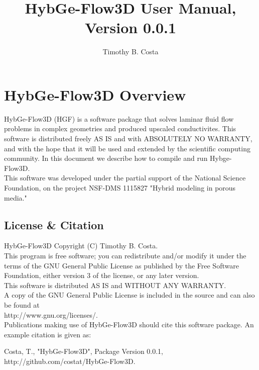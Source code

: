 \documentclass{report}
\title{HybGe-Flow3D User Manual, Version 0.0.1}
\author{Timothy B. Costa}
\begin{document}
\maketitle
\tableofcontents

\chapter{HybGe-Flow3D Overview}

HybGe-Flow3D (HGF) is a software package that solves laminar fluid flow problems
in complex geometries and produced upscaled conductivites. This software
is distributed freely AS IS and with ABSOLUTELY NO WARRANTY, and with
the hope that it will be used and extended by the scientific computing community.
In this document we describe how to compile and run Hybge-Flow3D.\\

This software was developed under the partial support of the National Science Foundation,
on the project NSF-DMS 1115827 "Hybrid modeling in porous media."

\section{License \& Citation}

HybGe-Flow3D Copyright (C) Timothy B. Costa.\\

\noindent This program is free software; you can redistribute and/or modify it under the terms
of the GNU General Public License as published by the Free Software Foundation, either
version 3 of the license, or any later version.\\

\noindent This software is distributed AS IS and WITHOUT ANY WARRANTY.\\

\noindent A copy of the GNU General Public License is included in the source and can also be found
at \\ http://www.gnu.org/licenses/.\\

\noindent Publications making use of HybGe-Flow3D should cite this software package. An example citation
is given as:

\begin{mdframed}[style=MyFrame]
  Costa, T., "HybGe-Flow3D", Package Version 0.0.1, http://github.com/costat/HybGe-Flow3D.
\end{mdframed}
\end{document}
